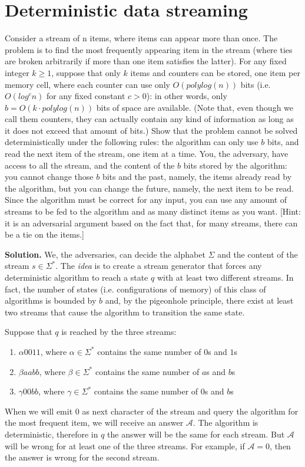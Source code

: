 \section{Deterministic data streaming}

Consider a stream of n items, where items can appear more than once. The problem is to find the most frequently appearing item in the stream (where ties are broken arbitrarily if more than one item satisfies the latter). For any fixed integer $k \geq 1$, suppose that only $k$ items and counters can be stored, one item per memory cell, where each counter can use only $O(polylog(n))$ bits (i.e. $O(log^c n)$ for any fixed constant $c > 0$): in other words, only $b = O(k\cdot polylog(n))$ bits of space are available. (Note that, even though we call them counters, they can actually contain any kind of information as long as it does not exceed that amount of bits.)
Show that the problem cannot be solved deterministically under the following rules: the algorithm can only use $b$ bits, and read the next item of the stream, one item at a time. You, the adversary, have access to all the stream, and the content of the $b$ bits stored by the algorithm: you cannot change those $b$ bits and the past, namely, the items already read by the algorithm, but you can change the future, namely, the next item to be read. Since the algorithm must be correct for any input, you can use any amount of streams to be fed to the algorithm and as many distinct items as you want. [Hint: it is an adversarial argument based on the fact that, for many streams, there can be a tie on the items.]

\vspace{1cm}
\noindent
\textbf{Solution.} We, the adversaries, can decide the alphabet $\Sigma$ and the content of the stream $s\in \Sigma^*$. The \emph{idea} is to create a stream generator that forces any deterministic algorithm to reach a state $q$ with at least two different streams. In fact, the number of states (i.e. configurations of memory) of this class of algorithms is bounded by $b$ and, by the pigeonhole principle, there exist at least two streams that cause the algorithm to transition the same state.

Suppose that $q$ is reached by the three streams:  
\begin{enumerate}
  \item $\alpha 0011$, where $\alpha\in\Sigma^*$ contains the same number of $0$s and $1$s
  \item $\beta aabb$, where $\beta\in\Sigma^*$ contains the same number of $a$s and $b$s
  \item $\gamma 00bb $, where $\gamma\in\Sigma^*$ contains the same number of $0$s and $b$s
\end{enumerate}
When we will emit 0 as next character of the stream and query the algorithm for the most frequent item, we will receive an answer $\mathcal{A}$. The algorithm is deterministic, therefore in $q$ the answer will be the same for each stream. But $\mathcal{A}$ will be wrong for at least one of the three streams. For example, if $\mathcal{A}=0$, then the answer is wrong for the second stream.


